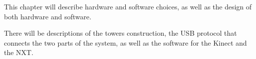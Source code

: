 This chapter will describe hardware and software choices, as well as the design of both hardware and software.

There will be descriptions of the towers construction, the USB protocol that connects the two parts of the system, as well as the software for the Kinect and the NXT.